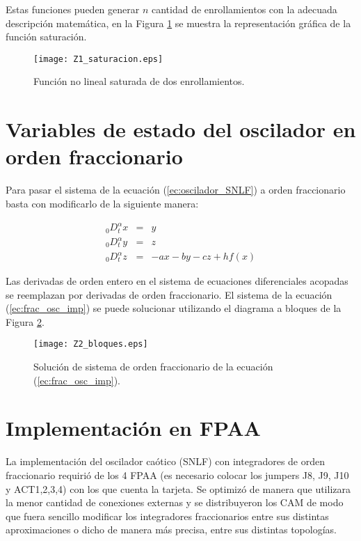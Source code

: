 	Estas funciones pueden generar $n$ cantidad de enrollamientos con la adecuada descripción matemática, en la Figura \ref{fig:Z1_saturacion} se muestra la representación gráfica de la función saturación. 
	
	\begin{figure}[!ht]
		\caption{Función no lineal saturada de dos enrollamientos.} 
		\label{fig:Z1_saturacion}
		\centering
		\texttt{[image: Z1\_saturacion.eps]}
	\end{figure}
	
		\section{Variables de estado del oscilador en orden fraccionario}
	 Para pasar el sistema de la ecuación (\ref{ec:oscilador_SNLF}) a orden fraccionario basta con modificarlo de la siguiente manera:
	 
	 \begin{equation}
		 \begin{array}{lcl}
		_{0}D_{t}^{\alpha}x & = & y \\
		_{0}D_{t}^{\alpha}y  & = & z\\
		_{0}D_{t}^{\alpha}z  & = & -ax - by -cz + hf(x)
		\end{array}
		\label{ec:frac_osc_imp}
	\end{equation}
	
	Las derivadas de orden entero en el sistema de ecuaciones diferenciales acopadas se reemplazan por derivadas de orden fraccionario. El sistema de la ecuación (\ref{ec:frac_osc_imp}) se puede solucionar utilizando el diagrama a bloques de la Figura \ref{fig:Z2_bloques}.
	
	\begin{figure}[!ht]
		\caption{Solución de sistema de orden fraccionario de la ecuación (\ref{ec:frac_osc_imp}).}
		\label{fig:Z2_bloques}
		\centering
		\texttt{[image: Z2\_bloques.eps]}
	\end{figure}
	
	\section{Implementación en FPAA}
	
	La implementación del oscilador caótico (SNLF) con integradores de orden fraccionario requirió de los 4 FPAA (es necesario colocar los jumpers J8, J9, J10 y ACT1,2,3,4) con los que cuenta la tarjeta. Se optimizó de manera que utilizara la menor cantidad de conexiones externas y se distribuyeron los CAM de modo que fuera sencillo modificar los integradores fraccionarios entre sus distintas aproximaciones o dicho de manera más precisa, entre  sus distintas topologías. 
	
